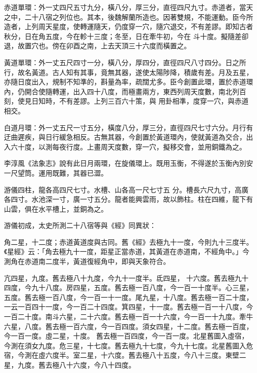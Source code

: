 \begin{pinyinscope}
 赤道單環：外一丈四尺五寸九分，橫八分，厚三分，直徑四尺九寸。赤道者，當天之中，二十八宿之列位也。其本，後魏解蘭所造也。因著雙規，不能運動。臣今所造者，上列周天星度，使轉運隨天，仍度穿一穴，隨穴退交，不有差謬。即知古者秋分，日在角五度，今在軫十三度；冬至，日在牽牛初，今在
 斗十度。擬隨差卻退，故置穴也。傍在卯酉之南，上去天頂三十六度而橫置之。



 黃道單環：外一丈五尺四寸一分，橫八分，厚四分，直徑四尺八寸四分。日之所行，故名黃道。古人知有其事，竟無其器，遂使太陽陟降，積歲有差。月及五星，亦隨日度出入，規制不知準的，斟量為率，疏闊尤多。臣今創置此環，置於赤道環內，仍開合使隨轉運，出入四十八度，而極畫兩方，東西列周天度數，南北列百刻，使見日知時，不有差謬。上列三百六十策，與
 用卦相準，度穿一穴，與赤道相交。



 白道月環：外一丈五尺一寸五分，橫度八分，厚三分，直徑四尺七寸六分。月行有迂曲遲疾，與日行緩急相反。古無其器，今創置於黃道環內，使就黃道為交合，出入六十度，以測每夜行度。上畫周天度數，穿一穴，擬移交會，並用銅鐵為之。



 李淳風《法象志》說有此日月兩環，在旋儀環上。既用玉衡，不得遂於玉衡內別安一尺望筒。運用既難，其器已澀。



 游儀四柱，龍各高四尺七寸。水槽、山各高一尺七寸五
 分。槽長六尺九寸，高廣各四寸。水池深一寸，廣一寸五分。龍者能興雲雨，故以飾柱。柱在四維，龍下有山雲，俱在水平槽上，並銅為之。



 游儀初成，太史所測二十八宿等與《經》同異狀：



 角二星，十二度；赤道黃道度與古同。舊《經》去極九十一度，今則九十三度半。《星經》云：「角去極九十一度，距星正當赤道，其黃道在赤道南，不經角中。」今測角在赤道南二度半，黃道復經角中，即與天象符合。



 亢四星，九度。舊去極八十九度，今九十一度半。氐四星，
 十六度。舊去極九十四度，今九十八度。房四星，五度。舊去極一百八度，今一百一十度半。心三星，五度。舊去極一百八度，今一百一十一度。尾九星，十八度。舊去極一百二十度，一云一百四十一度，今一百二十四度。箕四星，十一度。舊去極一百一十八度，今一百二十度。南斗六星，二十六度。舊去極一百一十六度，今一百一十九度。牽牛六星，八度。舊去極一百六度，今一百四度。須女四星，十二度。舊去極一百度，今一百一度。虛二星，十度。
 舊去極一百四度，今一百一度。北星舊圖入虛宿，今測在須女九度。危三星，十七度。舊去極九十七度，今九十七度。北星舊圖入危宿，今測在虛六度半。室二星，十六度。舊去極八十五度，今八十三度。東壁二星，九度。舊去極八十六度，今八十四度。




\end{pinyinscope}
